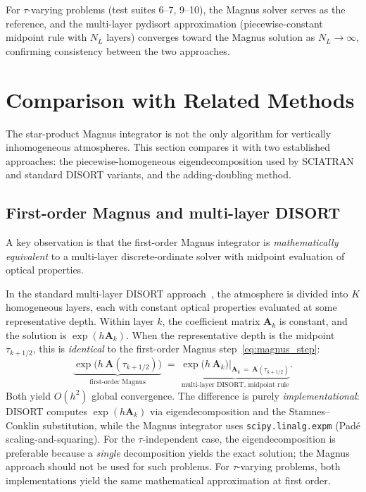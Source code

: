 \documentclass[11pt,a4paper]{article}
\newcommand{\mat}[1]{\mathbf{#1}}
\theoremstyle{definition}
\begin{document}
For $\tau$-varying problems (test suites 6--7, 9--10), the Magnus
solver serves as the reference, and the multi-layer pydisort
approximation (piecewise-constant midpoint rule with $N_L$ layers)
converges toward the Magnus solution as $N_L\to\infty$, confirming
consistency between the two approaches.


\section{Comparison with Related Methods}\label{sec:comparison}

The star-product Magnus integrator is not the only algorithm for
vertically inhomogeneous atmospheres.  This section compares it with
two established approaches: the piecewise-homogeneous eigendecomposition
used by SCIATRAN and standard DISORT variants, and the adding-doubling
method.

\subsection{First-order Magnus and multi-layer DISORT}\label{sec:magnus_equiv}

A key observation is that the first-order Magnus integrator is
\emph{mathematically equivalent} to a multi-layer discrete-ordinate
solver with midpoint evaluation of optical properties.

In the standard multi-layer DISORT approach~\cite{stamnes1988}, the
atmosphere is divided into $K$ homogeneous layers, each with constant
optical properties evaluated at some representative depth.  Within layer
$k$, the coefficient matrix $\mat{A}_k$ is constant, and the solution
is $\exp(h\mat{A}_k)$.  When the representative depth is the
midpoint $\tau_{k+1/2}$, this is \emph{identical} to the first-order
Magnus step~\eqref{eq:magnus_step}:
\begin{equation}\label{eq:equiv}
  \underbrace{\exp\bigl(h\,\mat{A}(\tau_{k+1/2})\bigr)}_{\text{first-order Magnus}}
  \;=\;
  \underbrace{\exp\bigl(h\,\mat{A}_k\bigr)\big|_{\mat{A}_k\,=\,\mat{A}(\tau_{k+1/2})}}_{\text{multi-layer DISORT, midpoint rule}}.
\end{equation}
Both yield $O(h^2)$ global convergence.  The difference is purely
\emph{implementational}: DISORT computes $\exp(h\mat{A}_k)$ via
eigendecomposition and the Stamnes--Conklin substitution, while the
Magnus integrator uses \texttt{scipy.linalg.expm} (Pad\'e
scaling-and-squaring).  For the $\tau$-independent case, the
eigendecomposition is preferable because a \emph{single} decomposition
yields the exact solution; the Magnus approach should not be used for
such problems.  For $\tau$-varying problems, both implementations yield
the same mathematical approximation at first order.
\end{document}
